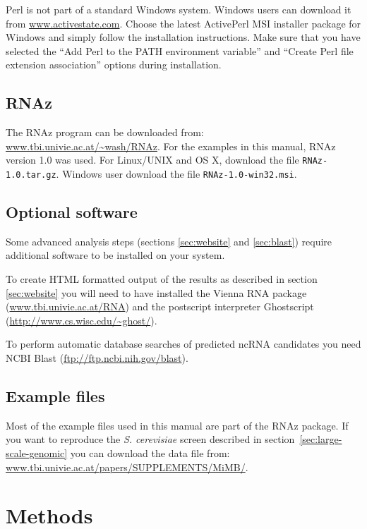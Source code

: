 \documentclass[11pt]{article}
\begin{document}
Perl is not part of a standard Windows system. Windows users can download it
from \url{www.activestate.com}. Choose the latest ActivePerl MSI installer
package for Windows and simply follow the installation instructions. Make
sure that you have selected the ``Add Perl to the PATH environment
variable'' and ``Create Perl file extension association'' options during
installation.

\subsection{RNAz}

The RNAz program can be downloaded from:
\url{www.tbi.univie.ac.at/~wash/RNAz}. For the examples in this manual,
RNAz version 1.0 was used. For Linux/UNIX and OS X, download the file
\texttt{RNAz-1.0.tar.gz}. Windows user download the file
\texttt{RNAz-1.0-win32.msi}.

\subsection{Optional software}
\label{sec:optional-software}

Some advanced analysis steps (sections \ref{sec:website} and
\ref{sec:blast}) require additional software to be installed on your
system.

To create HTML formatted output of the results as described in section
\ref{sec:website} you will need to have installed the Vienna RNA package
(\url{www.tbi.univie.ac.at/RNA}) and the postscript interpreter Ghostscript
(\url{http://www.cs.wisc.edu/~ghost/}).

To perform automatic database searches of predicted ncRNA candidates you
need NCBI Blast (\url{ftp://ftp.ncbi.nih.gov/blast}).


\subsection{Example files}

Most of the example files used in this manual are part of the RNAz
package. If you want to reproduce the \emph{S. cerevisiae} screen described
in section~\ref{sec:large-scale-genomic} you can download the data file
from: \url{www.tbi.univie.ac.at/papers/SUPPLEMENTS/MiMB/}.

\section{Methods}
\end{document}
